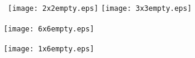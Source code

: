 \documentclass[12pt]{article}
\begin{document}
\hfill\
\texttt{[image: 2x2empty.eps]}\hfill
\texttt{[image: 3x3empty.eps]}\hfill~
\vfill

\hfill\texttt{[image: 6x6empty.eps]}\hfill~
\vfill

\hfill\texttt{[image: 1x6empty.eps]}\hfill~
\vfill
\end{document}

